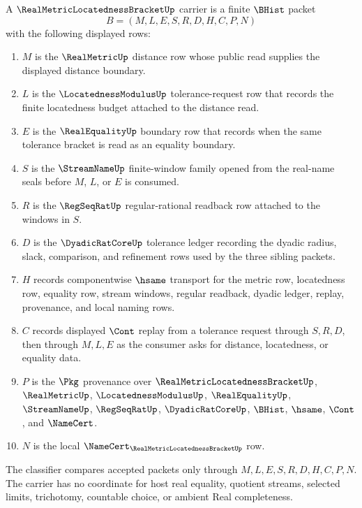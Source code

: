 \begin{definition}
\label{def:real-metric-locatedness-bracket-carrier}
A $\RealMetricLocatednessBracketUp$ carrier is a finite $\BHist$ packet
$$
B=(M,L,E,S,R,D,H,C,P,N)
$$
with the following displayed rows:
\begin{enumerate}
\item $M$ is the $\RealMetricUp$ distance row whose public read supplies the displayed distance boundary.
\item $L$ is the $\LocatednessModulusUp$ tolerance-request row that records the finite locatedness budget attached to the distance read.
\item $E$ is the $\RealEqualityUp$ boundary row that records when the same tolerance bracket is read as an equality boundary.
\item $S$ is the $\StreamNameUp$ finite-window family opened from the real-name seals before $M$, $L$, or $E$ is consumed.
\item $R$ is the $\RegSeqRatUp$ regular-rational readback row attached to the windows in $S$.
\item $D$ is the $\DyadicRatCoreUp$ tolerance ledger recording the dyadic radius, slack, comparison, and refinement rows used by the three sibling packets.
\item $H$ records componentwise $\hsame$ transport for the metric row, locatedness row, equality row, stream windows, regular readback, dyadic ledger, replay, provenance, and local naming rows.
\item $C$ records displayed $\Cont$ replay from a tolerance request through $S,R,D$, then through $M,L,E$ as the consumer asks for distance, locatedness, or equality data.
\item $P$ is the $\Pkg$ provenance over $\RealMetricLocatednessBracketUp$, $\RealMetricUp$, $\LocatednessModulusUp$, $\RealEqualityUp$, $\StreamNameUp$, $\RegSeqRatUp$, $\DyadicRatCoreUp$, $\BHist$, $\hsame$, $\Cont$, and $\NameCert$.
\item $N$ is the local $\NameCert_{\RealMetricLocatednessBracketUp}$ row.
\end{enumerate}
The classifier compares accepted packets only through $M,L,E,S,R,D,H,C,P,N$. The carrier has no coordinate for host real equality, quotient streams, selected limits, trichotomy, countable choice, or ambient Real completeness.
\end{definition}

